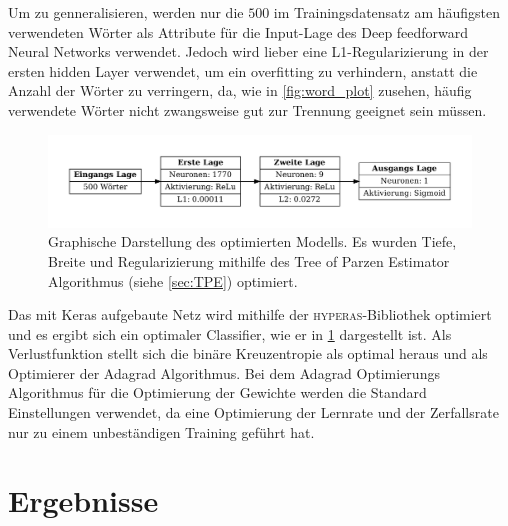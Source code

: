 Um zu genneralisieren, werden nur die $500$ im Trainingsdatensatz am häufigsten verwendeten Wörter als Attribute 
für die Input-Lage des Deep feedforward Neural Networks verwendet. 
Jedoch wird lieber eine L1-Regularizierung in der ersten hidden Layer verwendet, um ein overfitting zu verhindern, 
anstatt die Anzahl der Wörter zu verringern, da, wie in \ref{fig:word_plot} zusehen, häufig verwendete Wörter nicht 
zwangsweise gut zur Trennung geeignet sein müssen.

\begin{figure}
    \centering
    \includegraphics[width=\textwidth]{pictures/modell_scheme.pdf}
    \caption{Graphische Darstellung des optimierten Modells. Es wurden Tiefe, Breite und Regularizierung mithilfe 
            des Tree of Parzen Estimator Algorithmus (siehe \ref{sec:TPE}) optimiert.}
    \label{fig:NN_structure}
\end{figure}

Das mit Keras\cite{keras} aufgebaute Netz wird mithilfe der \textsc{hyperas}-Bibliothek\cite{hyperas} optimiert und 
es ergibt sich ein optimaler Classifier, wie er in \ref{fig:NN_structure} dargestellt ist.
Als Verlustfunktion stellt sich die binäre Kreuzentropie als optimal heraus und als Optimierer der Adagrad Algorithmus.
Bei dem Adagrad Optimierungs Algorithmus für die Optimierung der Gewichte werden die Standard Einstellungen verwendet, 
da eine Optimierung der Lernrate und der Zerfallsrate nur zu einem unbeständigen Training geführt hat.


\chapter{Ergebnisse}

